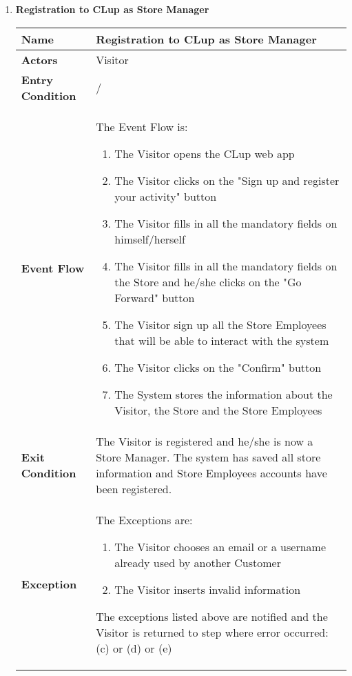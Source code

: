 \begin{enumerate}
            \item \textbf{Registration to CLup as Store Manager}{\renewcommand{\arraystretch}{2}
            \begin{longtable}{|L{4cm}|L{10cm}|}
                \hline
                \textbf{Name} & Registration to CLup as Store Manager \\
                \hline
                \textbf{Actors} & Visitor \\
                \hline
                \textbf{Entry Condition} & / \\
                \hline
                \textbf{Event Flow} & The Event Flow is: \begin{enumerate}
                        \item The Visitor opens the CLup web app
                        \item The Visitor clicks on the "Sign up and register your activity" button
                        \item The Visitor fills in all the mandatory fields on himself/herself
                        \item The Visitor fills in all the mandatory fields on the Store and he/she clicks on the "Go Forward" button
                        \item The Visitor sign up all the Store Employees that will be able to interact with the system
                        \item The Visitor clicks on the "Confirm" button
                        \item The System stores the information about the Visitor, the Store and the Store Employees
                    \end{enumerate} \\
                \hline
                \textbf{Exit Condition} & The Visitor is registered and he/she is now a Store Manager. The system has saved all store information and Store Employees accounts have been registered. \\
                \hline
                \textbf{Exception} & The Exceptions are: \begin{enumerate}
                        \item The Visitor chooses an email or a username already used by another Customer
                        \item The Visitor inserts invalid information
                    \end{enumerate} The exceptions listed above are notified and the Visitor is returned to step where error occurred: (c) or (d) or (e) \\

\end{longtable}}
\end{enumerate}
